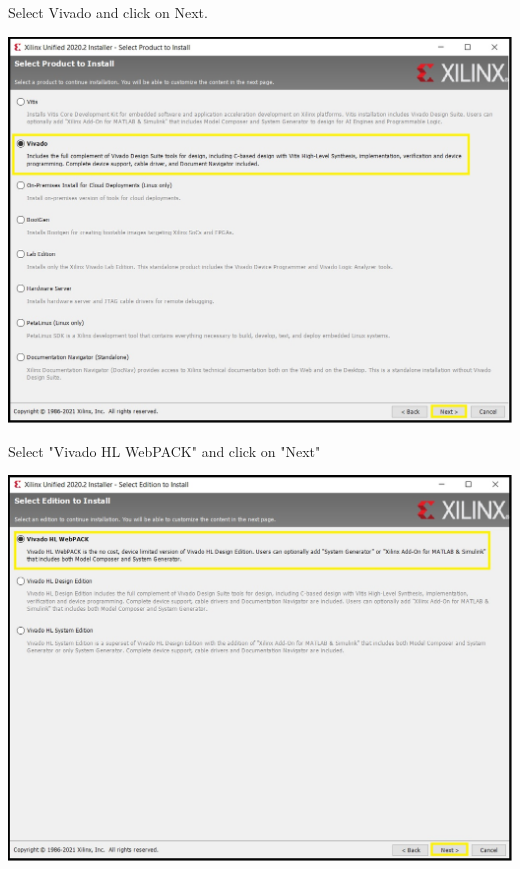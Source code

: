 \begin{minipage}{\linewidth}
  Select Vivado and click on Next.
  \\
  \begin{center}
    \includegraphics[width=0.7\linewidth]{images/VivadoInstimg010.jpg}
  \end{center}
\end{minipage}

\begin{minipage}{\linewidth}
  Select "Vivado HL WebPACK" and click on "Next"
  \\
  \begin{center}
    \includegraphics[width=0.7\linewidth]{images/VivadoInstimg011.jpg}
  \end{center}
\end{minipage}

